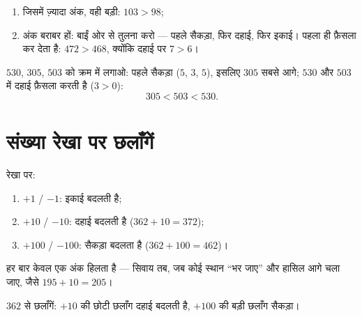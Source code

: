 \begin{method}[तीन अंकों वाली संख्याओं की तुलना]\label{met:g2:numbers:compare}
\begin{enumerate}
  \item जिसमें ज़्यादा अंक, वही बड़ी: $103 > 98$;
  \item अंक बराबर हों: बाईं ओर से तुलना करो --- पहले सैकड़ा, फिर
        दहाई, फिर इकाई। पहला  ही फ़ैसला कर देता है:
        $472 > 468$, क्योंकि दहाई पर $7 > 6$।
\end{enumerate}
\end{method}

\begin{example}\label{ex:g2:numbers:order}
$530$, $305$, $503$ को क्रम में लगाओ: पहले सैकड़ा ($5$, $3$, $5$),
इसलिए $305$ सबसे आगे; $530$ और $503$ में दहाई फ़ैसला करती है ($3 > 0$):
\[
305 < 503 < 530 .
\]
\end{example}

\section{संख्या रेखा पर छलाँगें}

\begin{method}[दहाई और सैकड़ा जोड़ना]\label{met:g2:numbers:jumps}
रेखा पर:
\begin{enumerate}
  \item $+1$ / $-1$: इकाई बदलती है;
  \item $+10$ / $-10$: दहाई बदलती है ($362 + 10 = 372$);
  \item $+100$ / $-100$: सैकड़ा बदलता है ($362 + 100 = 462$)।
\end{enumerate}
हर बार केवल एक अंक हिलता है --- सिवाय तब, जब कोई स्थान ``भर
जाए'' और हासिल आगे चला जाए, जैसे $195 + 10 = 205$।
\end{method}

\begin{omfigure}

{\small $362$ से छलाँगें: $+10$ की छोटी छलाँग दहाई बदलती है,
$+100$ की बड़ी छलाँग सैकड़ा।}
\end{omfigure}

